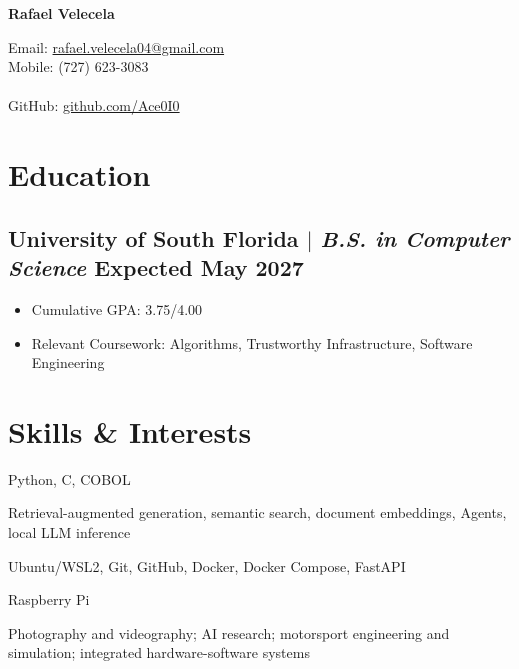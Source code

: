 \documentclass[11pt]{article}
\begin{document}
\begin{center}
    \begin{minipage}{0.5\textwidth}
        {\Huge\bfseries
            Rafael Velecela
        } \\ \medskip
    \end{minipage}\hfill
    \begin{minipage}{0.4\textwidth}
        \raggedleft
        Email: \href{mailto:rafael.velecela04@gmail.com}{rafael.velecela04@gmail.com}\\
        Mobile: (727) 623-3083\\
        \\
        GitHub: \href{https://github.com/Ace0I0}{github.com/Ace0I0}
    \end{minipage}
\end{center}

\section{Education}
\subsection{University of South Florida $|$ {\normalfont\itshape B.S. in Computer Science} \hfill Expected May 2027}
\begin{itemize}
    \item Cumulative GPA: 3.75/4.00
    \item Relevant Coursework: Algorithms, Trustworthy Infrastructure, Software Engineering
\end{itemize}


\section{Skills \& Interests}
\begin{description}[itemsep=0pt]
    \item[Programming] Python, C, COBOL
    \item[AI \& Data] Retrieval-augmented generation, semantic search, document embeddings, Agents, local LLM inference
    \item[Tools] Ubuntu/WSL2, Git, GitHub, Docker, Docker Compose, FastAPI
    \item[Hardware] Raspberry Pi
    \item[Interests] Photography and videography; AI research; motorsport engineering and simulation; integrated hardware-software systems
\end{description}
\end{document}

